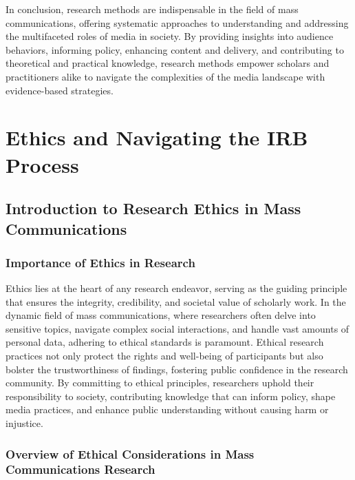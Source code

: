 \documentclass[
]{book}
\begin{document}
In conclusion, research methods are indispensable in the field of mass communications, offering systematic approaches to understanding and addressing the multifaceted roles of media in society. By providing insights into audience behaviors, informing policy, enhancing content and delivery, and contributing to theoretical and practical knowledge, research methods empower scholars and practitioners alike to navigate the complexities of the media landscape with evidence-based strategies.

\hypertarget{ethics-and-navigating-the-irb-process}{%
\chapter{Ethics and Navigating the IRB Process}\label{ethics-and-navigating-the-irb-process}}

\hypertarget{introduction-to-research-ethics-in-mass-communications}{%
\section{Introduction to Research Ethics in Mass Communications}\label{introduction-to-research-ethics-in-mass-communications}}

\hypertarget{importance-of-ethics-in-research}{%
\subsection*{Importance of Ethics in Research}\label{importance-of-ethics-in-research}}

Ethics lies at the heart of any research endeavor, serving as the guiding principle that ensures the integrity, credibility, and societal value of scholarly work. In the dynamic field of mass communications, where researchers often delve into sensitive topics, navigate complex social interactions, and handle vast amounts of personal data, adhering to ethical standards is paramount. Ethical research practices not only protect the rights and well-being of participants but also bolster the trustworthiness of findings, fostering public confidence in the research community. By committing to ethical principles, researchers uphold their responsibility to society, contributing knowledge that can inform policy, shape media practices, and enhance public understanding without causing harm or injustice.

\hypertarget{overview-of-ethical-considerations-in-mass-communications-research}{%
\subsection*{Overview of Ethical Considerations in Mass Communications Research}\label{overview-of-ethical-considerations-in-mass-communications-research}}
\end{document}
